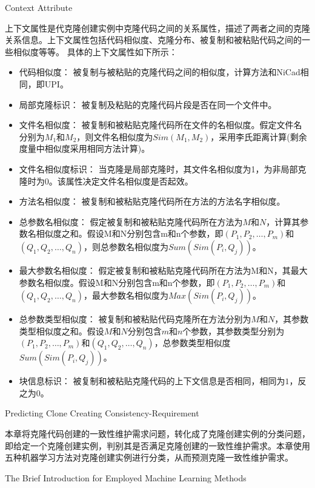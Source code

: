 {Context Attribute}

上下文属性是代克隆创建实例中克隆代码之间的关系属性，描述了两者之间的克隆关系信息。上下文属性包括代码相似度、克隆分布、被复制和被粘贴代码之间的一些相似度等等。
具体的上下文属性如下所示：

\begin{itemize}
\item
代码相似度：
被复制与被粘贴的克隆代码之间的相似度，计算方法和NiCad相同，即UPI\cite{roy2008nicad}。
\item
局部克隆标识：
被复制及粘贴的克隆代码片段是否在同一个文件中。
\item
文件名相似度：
被复制和被粘贴克隆代码所在文件的名相似度。假定文件名分别为$M_1$和$M_2$，则文件名相似度为$Sim(M_1,M_2)$，采用李氏距离\cite{levenshtein1966binary}计算(剩余度量中相似度采用相同方法计算)。
\item
文件名相似度标识：
当克隆是局部克隆时，其文件名相似度为1，为非局部克隆时为0。该属性决定文件名相似度是否起效。
\item
方法名相似度：
被复制和被粘贴克隆代码所在方法的方法名字相似度。
\item
总参数名相似度：
假定被复制和被粘贴克隆代码所在方法为$M$和$N$，计算其参数名相似度之和。假设M和N分别包含m和n个参数，即$(P_1,P_2,…,P_m)$和$(Q_1,Q_2,…,Q_n)$，则总参数名相似度为$Sum(Sim(P_i,Q_j))$。
\item
最大参数名相似度：
假定被复制和被粘贴克隆代码所在方法为M和N，其最大参数名相似度。假设M和N分别包含m和n个参数，即$(P_1,P_2,…,P_m)$和$(Q_1,Q_2,…,Q_n)$，最大参数名相似度为$Max(Sim(P_i,Q_j))$。
\item 
总参数类型相似度：
被复制和被粘贴代码克隆所在方法分别为$M$和$N$，其参数类型相似度之和。假设$M$和$N$分别包含$m$和$n$个参数，其参数类型分别为$(P_1,P_2,…,P_m)$和$(Q_1,Q_2,…,Q_n)$，总参数类型相似度$Sum(Sim(P_i,Q_j))$。
\item
块信息标识：
被复制和被粘贴克隆代码的上下文信息是否相同，相同为$1$，反之为$0$。
\end{itemize}

{Predicting Clone Creating Consistency-Requirement}

本章将克隆代码创建的一致性维护需求问题，转化成了克隆创建实例的分类问题，即给定一个克隆创建实例，判别其是否满足克隆创建的一致性维护需求。本章使用五种机器学习方法对克隆创建实例进行分类，从而预测克隆一致性维护需求。


{The Brief Introduction for Employed Machine Learning Methods}
\label{lab-machine}

